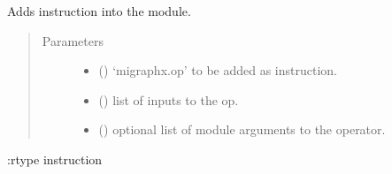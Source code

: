 \documentclass[letterpaper,10pt,english]{sphinxmanual}
\begin{document}
\begin{fulllineitems}
\label{\detokenize{reference/py:migraphx.add_instruction}}
\sphinxAtStartPar
Adds instruction into the module.
\begin{quote}\begin{description}
\item[{Parameters}] \leavevmode\begin{itemize}
\item {} 
\sphinxAtStartPar
{} () \textendash{} ‘migraphx.op’ to be added as instruction.

\item {} 
\sphinxAtStartPar
{} (\sphinxstyleliteralemphasis{\sphinxupquote{{[}}}\sphinxstyleliteralemphasis{\sphinxupquote{{]}}}) \textendash{} list of inputs to the op.

\item {} 
\sphinxAtStartPar
{} (\sphinxstyleliteralemphasis{\sphinxupquote{{[}}}\sphinxstyleliteralemphasis{\sphinxupquote{{]}}}) \textendash{} optional list of module arguments to the operator.

\end{itemize}

\end{description}\end{quote}

\sphinxAtStartPar
:rtype instruction

\end{fulllineitems}

\end{document}
